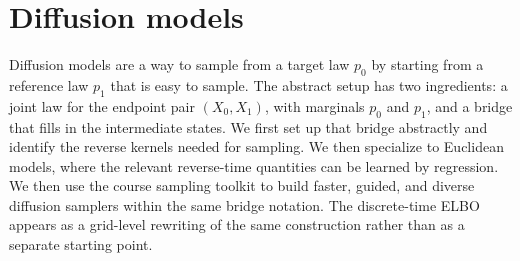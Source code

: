 \section{Diffusion models}
\label{sec:diffusion-models}

Diffusion models are a way to sample from a target law \(p_0\) by starting from a reference law \(p_1\) that is easy to sample.
The abstract setup has two ingredients: a joint law for the endpoint pair \((X_0,X_1)\), with marginals \(p_0\) and \(p_1\), and a bridge that fills in the intermediate states.
We first set up that bridge abstractly and identify the reverse kernels needed for sampling.
We then specialize to Euclidean models, where the relevant reverse-time quantities can be learned by regression.
We then use the course sampling toolkit to build faster, guided, and diverse diffusion samplers within the same bridge notation.
The discrete-time ELBO appears as a grid-level rewriting of the same construction rather than as a separate starting point.




